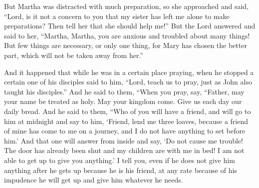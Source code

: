 \begin{biblechapter}
\verse But Martha was distracted with much preparation, so she approached and said, “Lord, is it not a concern to you that my sister has left me alone to make preparations? Then tell her that she should help me!”
\verse But the Lord answered and said to her, “Martha, Martha, you are anxious and troubled about many things!
\verse But few things are necessary, or only one thing, for Mary has chosen the better part, which will not be taken away from her.”
\end{biblechapter}

\begin{biblechapter} %
 And it happened that while he was in a certain place praying, when he stopped a certain one of his disciples said to him, “Lord, teach us to pray, just as John also taught his disciples.”
\verse And he said to them, “When you pray, say,
\verse “Father, 
may your name be treated as holy. 
May your kingdom come.
\verse Give us each day our daily bread.
 And he said to them, “Who of you will have a friend, and will go to him at midnight and say to him, ‘Friend, lend me three loaves,
\verse because a friend of mine has come to me on a journey, and I do not have anything to set before him.’
\verse And that one will answer from inside and say, ‘Do not cause me trouble! The door has already been shut and my children are with me in bed! I am not able to get up to give you anything.’
\verse I tell you, even if he does not give him anything after he gets up because he is his friend, at any rate because of his impudence he will get up and give him whatever he needs.

\end{biblechapter}
